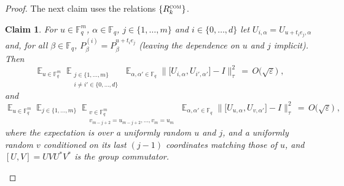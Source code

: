 \documentclass[11pt]{article}
\newtheorem{claim}[theorem]{Claim}
\theoremstyle{definition}
\newcommand{\Id}{\ensuremath{I}}
\DeclareMathOperator*{\Expectation}{\mathbb{E}}
\newcommand{\Es}[1]{\Expectation_{#1}}
\newcommand{\F}{\ensuremath{\mathbb{F}}}
\newcommand{\com}{\textsc{com}}
\newcommand{\eps}{\varepsilon}
\DeclareMathOperator{\tr}{tr}
\begin{document}
\begin{proof}

The next claim uses the relations $\{R^\com_k\}$.

\begin{claim}\label{claim:z2-stab-2b}
For $u\in \F_q^m$, $\alpha\in\F_q$, $j\in\{1,\ldots,m\}$ and $i\in \{0,\ldots,d\}$ let $U_{i,\alpha} = U_{u+t_ie_j,\alpha}$ and, for all $\beta\in\F_q$, $P^{(i)}_\beta = P^{u+t_ie_j}_\beta$ (leaving the dependence on $u$ and $j$ implicit). Then 
\begin{equation}\label{eq:z2-stab-2b-0a}
\Es{u\in \F_q^m} \Es{\substack{j\in\{1,\ldots,m\}\\i\neq i' \in \{0,\ldots,d\}}}\Es{\alpha,\alpha'\in \F_q} \big\| \big[ U_{i,\alpha}, U_{i',\alpha'}\big]-\Id\big\|_\tau^2\,=\, O\big(\sqrt{\eps}\big)\;, 
\end{equation}
and
\begin{equation}\label{eq:z2-stab-2b-0b}
 \Es{u\in \F_q^m} \Es{j\in\{1,\ldots,m\}} \Es{\substack{v\in \F_q^m \\v_{m-j+2}=u_{m-j+2},\ldots,v_m=u_m}}\Es{\alpha,\alpha'\in \F_q} \big\| \big[ U_{u,\alpha}, U_{v,\alpha'}\big]-\Id\big\|_\tau^2\,=\, O\big(\sqrt{\eps}\big)\;,
\end{equation}
where the expectation is over a uniformly random $u$ and $j$, and a uniformly random $v$ conditioned on its last $(j-1)$ coordinates matching those of $u$, and $[U,V]=UVU^* V^*$ is the group commutator. 
\end{claim}


\end{proof}
\end{document}
